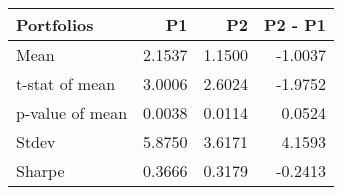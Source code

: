\begin{tabular}{lrrr}
\toprule
Portfolios & P1 & P2 & P2 - P1 \\
\midrule
Mean & 2.1537 & 1.1500 & -1.0037 \\
t-stat of mean & 3.0006 & 2.6024 & -1.9752 \\
p-value of mean & 0.0038 & 0.0114 & 0.0524 \\
Stdev & 5.8750 & 3.6171 & 4.1593 \\
Sharpe & 0.3666 & 0.3179 & -0.2413 \\
\bottomrule
\end{tabular}
